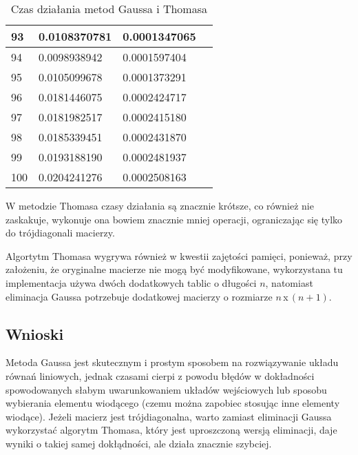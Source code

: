 \documentclass{article}
\begin{document}
\begin{table}[H]
{\begin{tabular}{|l|l|l|l|}
93 & 0.0108370781 & 0.0001347065 \\ \hline
94 & 0.0098938942 & 0.0001597404 \\ \hline
95 & 0.0105099678 & 0.0001373291 \\ \hline
96 & 0.0181446075 & 0.0002424717 \\ \hline
97 & 0.0181982517 & 0.0002415180 \\ \hline
98 & 0.0185339451 & 0.0002431870 \\ \hline
99 & 0.0193188190 & 0.0002481937 \\ \hline
100 & 0.0204241276 & 0.0002508163 \\ \hline
\end{tabular}
}
\caption{Czas działania metod Gaussa i Thomasa}
\end{table}

W metodzie Thomasa czasy działania są znacznie krótsze, co również nie zaskakuje, wykonuje ona bowiem znacznie mniej operacji, ograniczając
się tylko do trójdiagonali macierzy.

Algortytm Thomasa wygrywa również w kwestii zajętości pamięci, ponieważ, przy założeniu, że oryginalne macierze nie mogą być
modyfikowane, wykorzystana tu implementacja używa dwóch dodatkowych tablic o długości $n$, natomiast eliminacja Gaussa potrzebuje
dodatkowej macierzy o rozmiarze $n$\,x\,$(n+1)$.

\subsection{Wnioski}
Metoda Gaussa jest skutecznym i prostym sposobem na rozwiązywanie układu równań liniowych, jednak czasami cierpi z powodu 
błędów w dokładności spowodowanych słabym uwarunkowaniem układów wejściowych lub sposobu wybierania elementu wiodącego (czemu 
można zapobiec stosując inne elementy wiodące). Jeżeli macierz jest trójdiagonalna, warto zamiast 
eliminacji Gaussa wykorzystać algorytm Thomasa, który jest uproszczoną wersją eliminacji, daje wyniki o takiej samej dokłądności,
ale działa znacznie szybciej.
\end{document}
